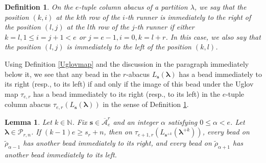 \documentclass[a4paper,10pt]{amsart}
\theoremstyle{plain}
\newcommand{\lam}{\lambda}
\def\bs{{\boldsymbol{s}}}
\def\N{{\mathbb N}}
\def\PP{\mathscr{P}}
\def\blam{{\boldsymbol \lambda}}
\theoremstyle{plain}
\newtheorem{lemma}[theorem]{Lemma}
\newtheorem{dfn}[theorem]{Definition}
\numberwithin{equation}{section}
\begin{document}
\begin{dfn}\label{rightLeft} On the $e$-tuple column abacus of a partition $\lam$, we say that the position $(k,i)$ at the $k$th row of the $i$-th runner is immediately to the right of the position $(l,j)$ at the $l$th row of the $j$-th runner if
either $k=l, 1\leq i=j+1<e$ or $j=e-1, i=0, k=l+r$. In this case, we also  say that the position $(l,j)$ is immediately to the left of the position $(k,l)$.
\end{dfn}


Using Definition \ref{Uglovmap} and the discussion in the paragraph immediately below it, we see that any bead in the $r$-abacus $L_\bs(\blam)$ has a bead immediately to its right (resp., to its left) if and only if
the image of this bead under the Uglov map $\tau_{e,r}$ has a  bead immediately to its right (resp., to its left) in the $e$-tuple column abacus $\tau_{e,r}( L_\bs(\blam))$ in the sense of Definition \ref{rightLeft}.





\begin{lemma}\label{right}
Let $k\in\N$. Fix $\bs\in \overline{\mathcal A}^r_e$ and an integer \(\alpha\) satisfying \(0\le \alpha<e\). Let $\blam\in\PP_{r,n}$. If $(k-1)e \ge s_r+  n$, then on \(\tau_{e+1,r}(L_{\boldsymbol{s}^{+k}}(\boldsymbol{\lambda}^{+k}))\), every bead on \(\tilde{\rho}_{\alpha-1}\) has another bead immediately to its right, and every bead on \(\tilde{\rho}_{\alpha+1}\) has another bead immediately to its left.
\end{lemma}
\end{document}
